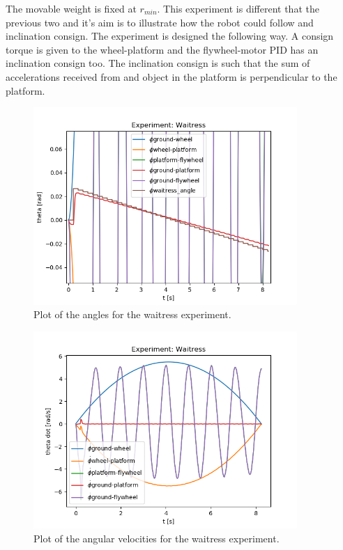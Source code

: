 \begin{enumerate}
	The movable weight is fixed at $r_{min}$. This experiment is different that the previous two and it's aim is to illustrate
		  how the robot could follow and inclination consign. The experiment is designed
		  the following way. A consign torque is given to the wheel-platform and the
		  flywheel-motor PID has an inclination consign too. The inclination consign is such
		  that the sum of accelerations received from and object in the platform is perpendicular
		  to the platform. 



	      \begin{figure}[H]
		      \centering
		      \includegraphics[width=10cm]{img/lagrange_5/waitress_q_zoom.png}
		      \caption{Plot of the angles for the waitress experiment.}
		      \label{fig:Simulation pendulum q}
	      \end{figure}


	      \begin{figure}[H]
		      \centering
		      \includegraphics[width=10cm]{img/lagrange_5/waitress_q_dot.png}
		      \caption{Plot of the angular velocities for the waitress experiment.}
		      \label{fig:Simulation pendulum q dot}
	      \end{figure}

\end{enumerate}

